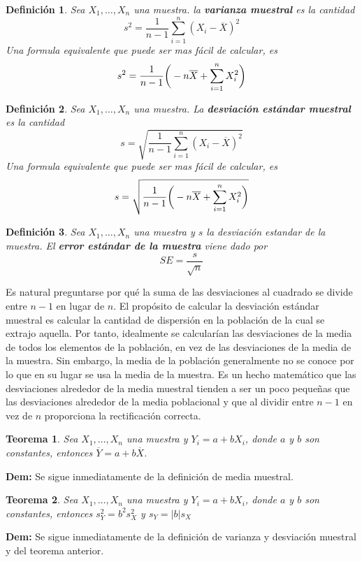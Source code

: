 \documentclass[10pt,a4paper]{book}
\newtheorem{defi}{\textbf{Definición}}
\newtheorem{teo}{\textbf{Teorema}}
\begin{document}
\begin{defi}
	Sea $ X_1, \ldots, X_n $ una muestra. la \textbf{varianza muestral} es la cantidad 
	$$ s^2 = \frac{1}{n-1} \sum_{i=1}^{n} (X_i - \overline{X})^2$$
	Una formula equivalente que puede ser mas fácil de calcular, es
	$$ s^2 = \frac{1}{n-1} \bigg{(} - n\overline{X} + \sum_{i=1}^{n} X^2_i \bigg{)}$$
\end{defi}

\begin{defi}
	Sea $ X_1, \ldots, X_n $ una muestra. La \textbf{desviación estándar muestral} es la cantidad
	$$ s = \sqrt{ \frac{1}{n-1} \sum_{i=1}^{n} (X_i - \overline{X})^2}$$
	Una formula equivalente que puede ser mas fácil de calcular, es
	$$ s = \sqrt{ \frac{1}{n-1} \bigg{(} - n\overline{X} + \sum_{i=1}^{n} X^2_i \bigg{)} }$$
\end{defi}

\begin{defi}
	Sea $ X_1, \ldots, X_n $ una muestra y $ s $ la desviación estandar de la muestra. El \textbf{error estándar de la muestra} viene dado por $$ SE = \frac{s}{\sqrt{n}}$$
\end{defi}

Es natural preguntarse por qué la suma de las desviaciones al cuadrado se divide entre $ n-1 $ en lugar de $ n $. El propósito de calcular la desviación estándar muestral es calcular la cantidad de dispersión en la población de la cual se extrajo aquella. Por tanto, idealmente se calcularían las desviaciones de la media de todos los elementos de la población, en vez de las desviaciones de la media de la muestra. Sin embargo, la media de la población generalmente no se conoce por lo que en su lugar se usa la media de la muestra. Es un hecho matemático que las desviaciones alrededor de la media muestral tienden a ser un poco pequeñas que las desviaciones alrededor de la media poblacional y que al dividir entre $ n-1 $ en vez de $ n $ proporciona la rectificación correcta.

\begin{teo}
	Sea $ X_1, \ldots, X_n $ una muestra y $ Y_i = a + bX_i $, donde $ a $ y $ b $ son constantes, entonces $ \overline{Y} = a +b\overline{X} $.	
\end{teo}
\textbf{Dem:} Se sigue inmediatamente de la definición de media muestral.

\begin{teo}
	Sea $ X_1, \ldots, X_n $ una muestra y $ Y_i = a + bX_i $, donde $ a $ y $ b $ son constantes, entonces $s^2_Y= b^2 s^2_X$ y $s_Y = |b|s_X$
\end{teo}
\textbf{Dem:} Se sigue inmediatamente de la definición de varianza y desviación muestral y del teorema anterior.
\end{document}
